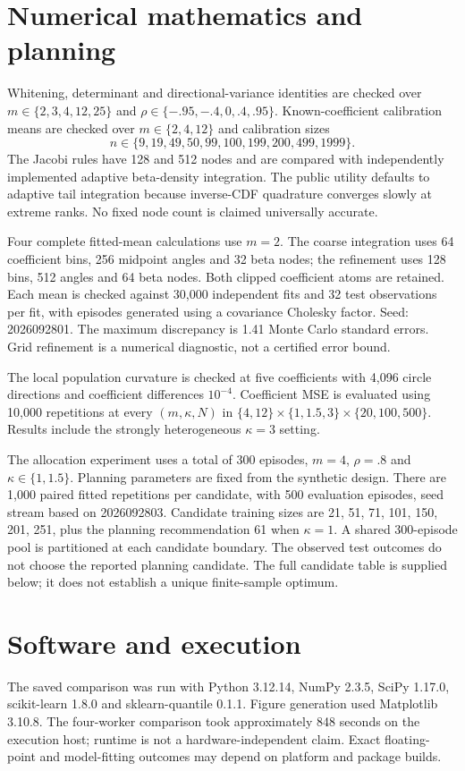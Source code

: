 \documentclass[10pt]{article}
\begin{document}
\section{Numerical mathematics and planning}
Whitening, determinant and directional-variance identities are checked over $m\in\{2,3,4,12,25\}$ and $\rho\in\{-.95,-.4,0,.4,.95\}$. Known-coefficient calibration means are checked over $m\in\{2,4,12\}$ and calibration sizes
\[
n\in\{9,19,49,50,99,100,199,200,499,1999\}.
\] The Jacobi rules have 128 and 512 nodes and are compared with independently implemented adaptive beta-density integration. The public utility defaults to adaptive tail integration because inverse-CDF quadrature converges slowly at extreme ranks. No fixed node count is claimed universally accurate.

Four complete fitted-mean calculations use $m=2$. The coarse integration uses 64 coefficient bins, 256 midpoint angles and 32 beta nodes; the refinement uses 128 bins, 512 angles and 64 beta nodes. Both clipped coefficient atoms are retained. Each mean is checked against 30,000 independent fits and 32 test observations per fit, with episodes generated using a covariance Cholesky factor. Seed: 2026092801. The maximum discrepancy is 1.41 Monte Carlo standard errors. Grid refinement is a numerical diagnostic, not a certified error bound.

The local population curvature is checked at five coefficients with 4,096 circle directions and coefficient differences $10^{-4}$. Coefficient MSE is evaluated using 10,000 repetitions at every $(m,\kappa,N)$ in $\{4,12\}\times\{1,1.5,3\}\times\{20,100,500\}$. Results include the strongly heterogeneous $\kappa=3$ setting.

The allocation experiment uses a total of 300 episodes, $m=4$, $\rho=.8$ and $\kappa\in\{1,1.5\}$. Planning parameters are fixed from the synthetic design. There are 1,000 paired fitted repetitions per candidate, with 500 evaluation episodes, seed stream based on 2026092803. Candidate training sizes are 21, 51, 71, 101, 150, 201, 251, plus the planning recommendation 61 when $\kappa=1$. A shared 300-episode pool is partitioned at each candidate boundary. The observed test outcomes do not choose the reported planning candidate. The full candidate table is supplied below; it does not establish a unique finite-sample optimum.

\section{Software and execution}
The saved comparison was run with Python 3.12.14, NumPy 2.3.5, SciPy 1.17.0, scikit-learn 1.8.0 and sklearn-quantile 0.1.1. Figure generation used Matplotlib 3.10.8. The four-worker comparison took approximately 848 seconds on the execution host; runtime is not a hardware-independent claim. Exact floating-point and model-fitting outcomes may depend on platform and package builds.
\end{document}
